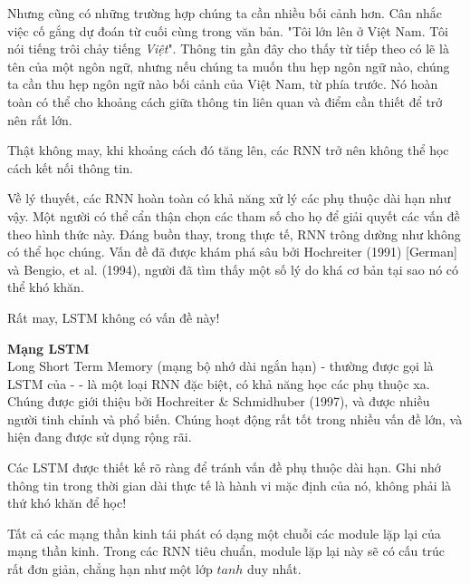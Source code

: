 Nhưng cũng có những trường hợp chúng ta cần nhiều bối cảnh hơn. Cân nhắc việc cố gắng dự đoán từ cuối cùng trong văn
bản. "Tôi lớn lên ở Việt Nam. Tôi nói tiếng trôi chảy tiếng \textit{Việt}". Thông tin gần đây cho thấy từ tiếp theo có
lẽ là tên của một ngôn ngữ, nhưng nếu chúng ta muốn thu hẹp ngôn ngữ nào, chúng ta cần thu hẹp ngôn ngữ nào bối cảnh
của Việt Nam, từ phía trước. Nó hoàn toàn có thể cho khoảng cách giữa thông tin liên quan và điểm cần thiết để trở
nên rất lớn.

Thật không may, khi khoảng cách đó tăng lên, các RNN trở nên không thể học cách kết nối thông tin.
\begin{figure}[H]
\end{figure}


Về lý thuyết, các RNN hoàn toàn có khả năng xử lý các phụ thuộc dài hạn như vậy. Một người có thể cẩn thận chọn các
tham số cho họ để giải quyết các vấn đề theo hình thức này. Đáng buồn thay, trong thực tế, RNN trông
dường như không có thể học chúng. Vấn đề đã được khám phá sâu bởi Hochreiter (1991) [German] và Bengio, et al. (1994),
người đã tìm thấy một số lý do khá cơ bản tại sao nó có thể khó khăn.

Rất may, LSTM không có vấn đề này!

\textbf{Mạng LSTM} \\[0.2em]
Long Short Term Memory (mạng bộ nhớ dài ngắn hạn) - thường được gọi là LSTM của - - là một loại RNN đặc biệt, có khả năng học các phụ thuộc xa. Chúng được giới thiệu bởi Hochreiter \& Schmidhuber (1997), và được nhiều người tinh chỉnh và phổ biến. Chúng hoạt động rất tốt trong nhiều vấn đề lớn, và hiện đang được sử dụng rộng rãi.

Các LSTM được thiết kế rõ ràng để tránh vấn đề phụ thuộc dài hạn. Ghi nhớ thông tin trong thời gian dài thực tế là hành vi mặc định của nó, không phải là thứ khó khăn để học!

Tất cả các mạng thần kinh tái phát có dạng một chuỗi các module lặp lại của mạng thần kinh. Trong các RNN tiêu chuẩn, module lặp lại này sẽ có cấu trúc rất đơn giản, chẳng hạn như một lớp \(tanh\) duy nhất.

